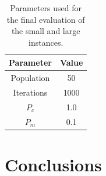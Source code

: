 \documentclass[10pt,a4paper]{article}
\begin{document}
\begin{table}[h]
\centering
\begin{tabular}{|c|c|}
\hline
Parameter & Value \\
\hline
Population &  50\\
Iterations & 1000\\
$P_c$ & 1.0\\
$P_m$ & 0.1\\
\hline
\end{tabular}
\caption{Parameters used for the final evaluation of the small and large instances.}
\label{tab:optimal_params}
\end{table}

\section{Conclusions}



\end{document}
